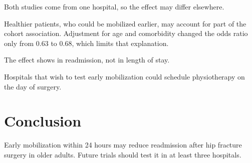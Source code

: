 Both studies come from one hospital, so the effect may differ elsewhere.

Healthier patients, who could be mobilized earlier, may account for part of the cohort association. Adjustment for age and comorbidity changed the odds ratio only from 0.63 to 0.68, which limits that explanation.

The effect shows in readmission, not in length of stay.

Hospitals that wish to test early mobilization could schedule physiotherapy on the day of surgery.

\section{Conclusion}

Early mobilization within 24 hours may reduce readmission after hip fracture surgery in older adults. Future trials should test it in at least three hospitals.
